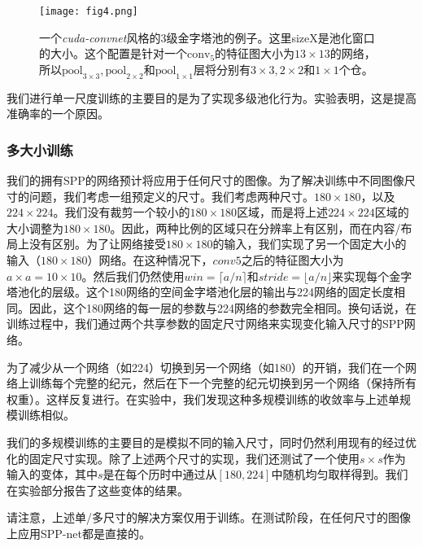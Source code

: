 \documentclass[../main.tex]{subfile}
\begin{document}
\begin{figure}[htb]
    \centering
    \texttt{[image: fig4.png]}
    \caption{一个\textit{cuda-convnet}风格\cite{alexnet}的3级金字塔池的例子。这里sizeX是池化窗口的大小。这个配置是针对一个$\text{conv}_5$的特征图大小为$13\times 13$的网络，所以$\text{pool}_{3\times 3}, \text{pool}_{2\times 2}$和$\text{pool}_{1\times 1}$层将分别有$3\times 3, 2\times 2$和$1\times 1$个仓。}
    \label{fig:fig4}
\end{figure}

我们进行单一尺度训练的主要目的是为了实现多级池化行为。实验表明，这是提高准确率的一个原因。

\subsubsection*{多大小训练}

我们的拥有SPP的网络预计将应用于任何尺寸的图像。为了解决训练中不同图像尺寸的问题，我们考虑一组预定义的尺寸。我们考虑两种尺寸。$180\times 180$，以及$224\times 224$。我们没有裁剪一个较小的$180\times 180$区域，而是将上述$224\times 224$区域的大小调整为$180\times 180$。因此，两种比例的区域只在分辨率上有区别，而在内容/布局上没有区别。为了让网络接受$180\times 180$的输入，我们实现了另一个固定大小的输入（$180\times 180$）网络。在这种情况下，$conv5$之后的特征图大小为$a\times a=10\times 10$。然后我们仍然使用$win=\lceil a/n \rceil $和$stride = \lfloor a/n \rfloor$来实现每个金字塔池化的层级。这个180网络的空间金字塔池化层的输出与224网络的固定长度相同。因此，这个180网络的每一层的参数与224网络的参数完全相同。换句话说，在训练过程中，我们通过两个共享参数的固定尺寸网络来实现变化输入尺寸的SPP网络。

为了减少从一个网络（如224）切换到另一个网络（如180）的开销，我们在一个网络上训练每个完整的纪元，然后在下一个完整的纪元切换到另一个网络（保持所有权重）。这样反复进行。在实验中，我们发现这种多规模训练的收敛率与上述单规模训练相似。

我们的多规模训练的主要目的是模拟不同的输入尺寸，同时仍然利用现有的经过优化的固定尺寸实现。除了上述两个尺寸的实现，我们还测试了一个使用$s\times s$作为输入的变体，其中$s$是在每个历时中通过从$\left[ 180, 224\right]$中随机均匀取样得到。我们在实验部分报告了这些变体的结果。

请注意，上述单/多尺寸的解决方案仅用于训练。在测试阶段，在任何尺寸的图像上应用SPP-net都是直接的。
\end{document}

